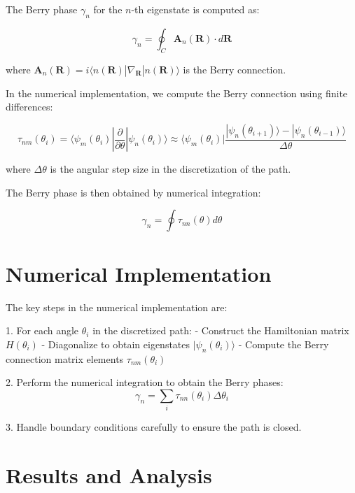 \documentclass{article}
\begin{document}
The Berry phase $\gamma_n$ for the $n$-th eigenstate is computed as:

\begin{equation}
\gamma_n = \oint_C \bm{A}_n(\bm{R}) \cdot d\bm{R}
\end{equation}

where $\bm{A}_n(\bm{R}) = i\langle n(\bm{R})|\nabla_{\bm{R}}|n(\bm{R})\rangle$ is the Berry connection.

In the numerical implementation, we compute the Berry connection using finite differences:

\begin{equation}
\tau_{nm}(\theta_i) = \langle \psi_m(\theta_i) | \frac{\partial}{\partial\theta} | \psi_n(\theta_i) \rangle \approx \langle \psi_m(\theta_i) | \frac{|\psi_n(\theta_{i+1})\rangle - |\psi_n(\theta_{i-1})\rangle}{\Delta\theta}
\end{equation}

where $\Delta\theta$ is the angular step size in the discretization of the path.

The Berry phase is then obtained by numerical integration:

\begin{equation}
\gamma_n = \oint \tau_{nn}(\theta) d\theta
\end{equation}

\section{Numerical Implementation}

The key steps in the numerical implementation are:

1. For each angle $\theta_i$ in the discretized path:
   - Construct the Hamiltonian matrix $H(\theta_i)$
   - Diagonalize to obtain eigenstates $|\psi_n(\theta_i)\rangle$
   - Compute the Berry connection matrix elements $\tau_{nm}(\theta_i)$

2. Perform the numerical integration to obtain the Berry phases:
   \begin{equation}
   \gamma_n = \sum_i \tau_{nn}(\theta_i) \Delta\theta_i
   \end{equation}

3. Handle boundary conditions carefully to ensure the path is closed.

\section{Results and Analysis}
\end{document}
